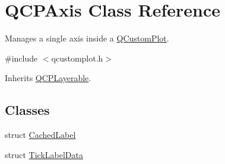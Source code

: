 \hypertarget{class_q_c_p_axis}{\section{Q\-C\-P\-Axis Class Reference}
\label{class_q_c_p_axis}
}


Manages a single axis inside a \hyperlink{class_q_custom_plot}{Q\-Custom\-Plot}.  




{\ttfamily \#include $<$qcustomplot.\-h$>$}



Inherits \hyperlink{class_q_c_p_layerable}{Q\-C\-P\-Layerable}.

\subsection*{Classes}
\begin{DoxyCompactItemize}
\item 
struct \hyperlink{struct_q_c_p_axis_1_1_cached_label}{Cached\-Label}
\item 
struct \hyperlink{struct_q_c_p_axis_1_1_tick_label_data}{Tick\-Label\-Data}
\end{DoxyCompactItemize}
